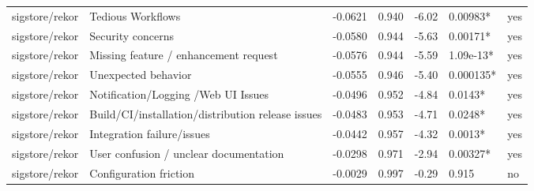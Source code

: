\begin{table}[t]
\begin{tabular}{lllllll}
sigstore/rekor & Tedious Workflows & -0.0621 & 0.940 & -6.02 & 0.00983* & yes \\
sigstore/rekor & Security concerns & -0.0580 & 0.944 & -5.63 & 0.00171* & yes \\
sigstore/rekor & Missing feature / enhancement request & -0.0576 & 0.944 & -5.59 & 1.09e-13* & yes \\
sigstore/rekor & Unexpected behavior & -0.0555 & 0.946 & -5.40 & 0.000135* & yes \\
sigstore/rekor & Notification/Logging /Web UI Issues & -0.0496 & 0.952 & -4.84 & 0.0143* & yes \\
sigstore/rekor & Build/CI/installation/distribution release issues & -0.0483 & 0.953 & -4.71 & 0.0248* & yes \\
sigstore/rekor & Integration failure/issues & -0.0442 & 0.957 & -4.32 & 0.0013* & yes \\
sigstore/rekor & User confusion / unclear documentation & -0.0298 & 0.971 & -2.94 & 0.00327* & yes \\
sigstore/rekor & Configuration friction & -0.0029 & 0.997 & -0.29 & 0.915 & no \\
\hline
\end{tabular}
\end{table}
